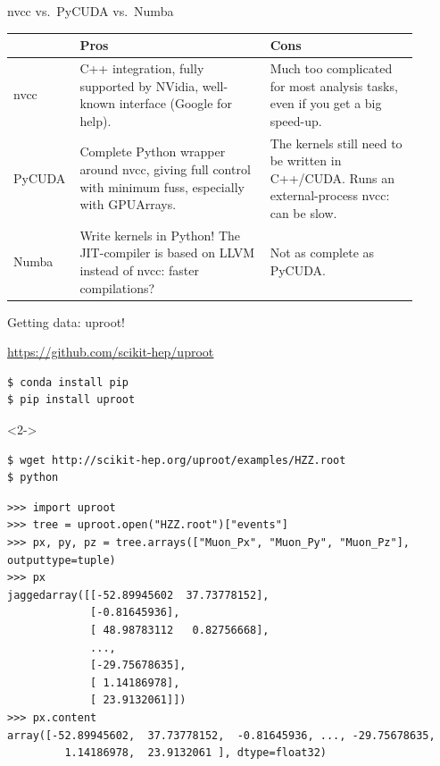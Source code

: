 \documentclass[aspectratio=169]{beamer}
\begin{document}
\begin{frame}{nvcc vs.\ PyCUDA vs.\ Numba}
\vspace{0.5 cm}

\renewcommand{\arraystretch}{2}
\begin{tabular}{p{0.1\linewidth} p{0.45\linewidth} p{0.35\linewidth}}
& Pros & Cons \\\hline
nvcc & C++ integration, fully supported by NVidia, well-known interface (Google for help). & Much too complicated for most analysis tasks, even if you get a big speed-up. \\
PyCUDA & Complete Python wrapper around nvcc, giving full control with minimum fuss, especially with GPUArrays. & The kernels still need to be written in C++/CUDA. Runs an external-process nvcc: can be slow. \\
Numba & Write kernels in Python! The JIT-compiler is based on LLVM instead of nvcc: faster compilations? & Not as complete as PyCUDA. \\
\end{tabular}
\end{frame}

\begin{frame}[fragile]{Getting data: uproot!}
\begin{center}
\textcolor{blue}{\underline{\url{https://github.com/scikit-hep/uproot}}}
\end{center}

\scriptsize
\begin{verbatim}
$ conda install pip
$ pip install uproot
\end{verbatim}

\begin{uncoverenv}<2->
\begin{verbatim}
$ wget http://scikit-hep.org/uproot/examples/HZZ.root
$ python
\end{verbatim}

\begin{verbatim}
>>> import uproot
>>> tree = uproot.open("HZZ.root")["events"]
>>> px, py, pz = tree.arrays(["Muon_Px", "Muon_Py", "Muon_Pz"], outputtype=tuple)
>>> px
jaggedarray([[-52.89945602  37.73778152],
             [-0.81645936],
             [ 48.98783112   0.82756668],
             ...,
             [-29.75678635],
             [ 1.14186978],
             [ 23.9132061]])
>>> px.content
array([-52.89945602,  37.73778152,  -0.81645936, ..., -29.75678635,
         1.14186978,  23.9132061 ], dtype=float32)
\end{verbatim}
\end{uncoverenv}
\end{frame}
\end{document}
